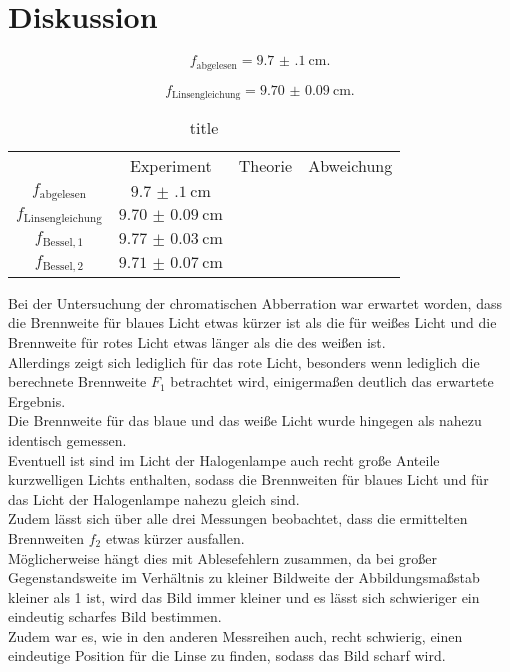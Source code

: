 \section{Diskussion}
\label{sec:Diskussion}
\begin{equation}
f_{\mathrm{abgelesen}}=\SI{9.7(1)}{\centi\meter}\text{.}
\end{equation}

\begin{equation}
f_{\mathrm{Linsengleichung}}=\SI{9.70(9)}{\centi\meter}\text{.}
\end{equation}
\begin{table}
  \caption{title}
  \label{tab:diskus}
  \begin{tabular}{cccc}
    \toprule
    &Experiment&Theorie&Abweichung\\
    $f_{\mathrm{abgelesen}}$&$\SI{9.7(1)}{\centi\meter}$&&\\
    $f_{\mathrm{Linsengleichung}}$&$\SI{9.70(9)}{\centi\meter}$&&\\
    $f_\mathrm{Bessel, 1}$&$\SI{9.77(3)}{\centi\meter}$&&\\
    $f_\mathrm{Bessel, 2}$&$\SI{9.71(7)}{\centi\meter}$&&\\
\end{tabular}
\end{table}


Bei der Untersuchung der chromatischen Abberration war erwartet worden, dass die Brennweite für blaues Licht etwas kürzer ist als die für weißes Licht und die Brennweite für rotes Licht etwas länger als die des weißen ist.\\
Allerdings zeigt sich lediglich für das rote Licht, besonders wenn lediglich die berechnete Brennweite $F_\mathrm{1}$ betrachtet wird, einigermaßen deutlich das erwartete Ergebnis.
\\Die Brennweite für das blaue und das weiße Licht wurde hingegen als nahezu identisch gemessen.
\\Eventuell ist sind im Licht der Halogenlampe auch recht große Anteile kurzwelligen Lichts enthalten, sodass die Brennweiten für blaues Licht und für das Licht der Halogenlampe nahezu gleich sind.
\\ Zudem lässt sich über alle drei Messungen beobachtet, dass die ermittelten Brennweiten $f_\mathrm{2}$ etwas kürzer ausfallen. \\Möglicherweise hängt dies mit Ablesefehlern zusammen, da bei großer Gegenstandsweite im Verhältnis zu kleiner Bildweite der Abbildungsmaßstab kleiner als 1 ist, wird das Bild immer kleiner und es lässt sich schwieriger ein eindeutig scharfes Bild bestimmen.
\\Zudem war es, wie in den anderen Messreihen auch, recht schwierig, einen eindeutige Position für die Linse zu finden, sodass das Bild scharf wird.

